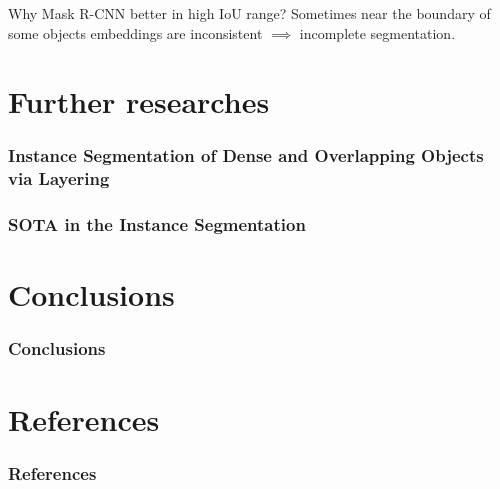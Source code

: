 \documentclass{beamer}
\begin{document}
\begin{frame}
    \begin{block}{Why Mask R-CNN better in high IoU range?}
        Sometimes near the boundary of some objects embeddings are
        inconsistent $\implies$ incomplete segmentation.
    \end{block}

\end{frame}

\section{Further researches}

\begin{frame}
    \frametitle{Instance Segmentation of Dense and Overlapping Objects via Layering}



\end{frame}

\begin{frame}
    \frametitle{SOTA in the Instance Segmentation}

\end{frame}

\section*{Conclusions}
\begin{frame}
    \frametitle{Conclusions}



\end{frame}

\section*{References}

\begin{frame}[allowframebreaks]
    \frametitle{References}

    
    
\end{frame}
\end{document}
